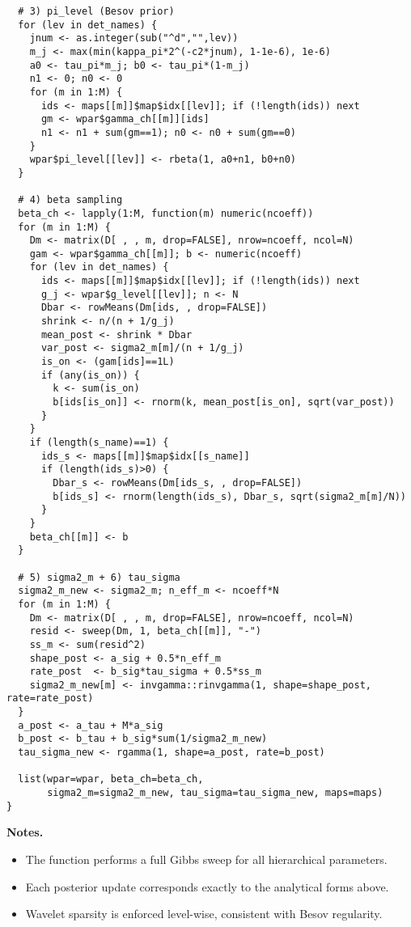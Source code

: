 \documentclass[11pt]{article}
\begin{document}
\begin{lstlisting}
  # 3) pi_level (Besov prior)
  for (lev in det_names) {
    jnum <- as.integer(sub("^d","",lev))
    m_j <- max(min(kappa_pi*2^(-c2*jnum), 1-1e-6), 1e-6)
    a0 <- tau_pi*m_j; b0 <- tau_pi*(1-m_j)
    n1 <- 0; n0 <- 0
    for (m in 1:M) {
      ids <- maps[[m]]$map$idx[[lev]]; if (!length(ids)) next
      gm <- wpar$gamma_ch[[m]][ids]
      n1 <- n1 + sum(gm==1); n0 <- n0 + sum(gm==0)
    }
    wpar$pi_level[[lev]] <- rbeta(1, a0+n1, b0+n0)
  }

  # 4) beta sampling
  beta_ch <- lapply(1:M, function(m) numeric(ncoeff))
  for (m in 1:M) {
    Dm <- matrix(D[ , , m, drop=FALSE], nrow=ncoeff, ncol=N)
    gam <- wpar$gamma_ch[[m]]; b <- numeric(ncoeff)
    for (lev in det_names) {
      ids <- maps[[m]]$map$idx[[lev]]; if (!length(ids)) next
      g_j <- wpar$g_level[[lev]]; n <- N
      Dbar <- rowMeans(Dm[ids, , drop=FALSE])
      shrink <- n/(n + 1/g_j)
      mean_post <- shrink * Dbar
      var_post <- sigma2_m[m]/(n + 1/g_j)
      is_on <- (gam[ids]==1L)
      if (any(is_on)) {
        k <- sum(is_on)
        b[ids[is_on]] <- rnorm(k, mean_post[is_on], sqrt(var_post))
      }
    }
    if (length(s_name)==1) {
      ids_s <- maps[[m]]$map$idx[[s_name]]
      if (length(ids_s)>0) {
        Dbar_s <- rowMeans(Dm[ids_s, , drop=FALSE])
        b[ids_s] <- rnorm(length(ids_s), Dbar_s, sqrt(sigma2_m[m]/N))
      }
    }
    beta_ch[[m]] <- b
  }

  # 5) sigma2_m + 6) tau_sigma
  sigma2_m_new <- sigma2_m; n_eff_m <- ncoeff*N
  for (m in 1:M) {
    Dm <- matrix(D[ , , m, drop=FALSE], nrow=ncoeff, ncol=N)
    resid <- sweep(Dm, 1, beta_ch[[m]], "-")
    ss_m <- sum(resid^2)
    shape_post <- a_sig + 0.5*n_eff_m
    rate_post  <- b_sig*tau_sigma + 0.5*ss_m
    sigma2_m_new[m] <- invgamma::rinvgamma(1, shape=shape_post, rate=rate_post)
  }
  a_post <- a_tau + M*a_sig
  b_post <- b_tau + b_sig*sum(1/sigma2_m_new)
  tau_sigma_new <- rgamma(1, shape=a_post, rate=b_post)

  list(wpar=wpar, beta_ch=beta_ch,
       sigma2_m=sigma2_m_new, tau_sigma=tau_sigma_new, maps=maps)
}
\end{lstlisting}

\noindent\textbf{Notes.}
\begin{itemize}
  \item The function performs a full Gibbs sweep for all hierarchical parameters.
  \item Each posterior update corresponds exactly to the analytical forms above.
  \item Wavelet sparsity is enforced level-wise, consistent with Besov regularity.
\end{itemize}
\end{document}
